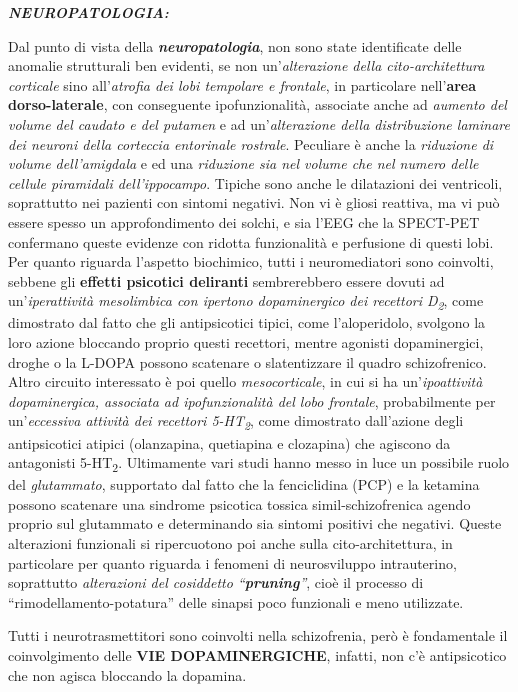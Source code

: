 \documentclass[]{article}
\begin{document}
\textbf{\emph{NEUROPATOLOGIA:}}

Dal punto di vista della \textbf{\emph{neuropatologia}}, non sono state
identificate delle anomalie strutturali ben evidenti, se non
un'\emph{alterazione della cito-architettura corticale} sino
all'\emph{atrofia dei lobi tempolare e frontale}, in particolare
nell'\textbf{area dorso-laterale}, con conseguente ipofunzionalità,
associate anche ad \emph{aumento del volume del caudato e del putamen} e
ad un'\emph{alterazione della distribuzione laminare dei neuroni della
corteccia entorinale rostrale}. Peculiare è anche la \emph{riduzione di
volume dell'amigdala} e ed una \emph{riduzione sia nel volume che nel
numero delle cellule piramidali dell'ippocampo}. Tipiche sono anche le
dilatazioni dei ventricoli, soprattutto nei pazienti con sintomi
negativi. Non vi è gliosi reattiva, ma vi può essere spesso un
approfondimento dei solchi, e sia l'EEG che la SPECT-PET confermano
queste evidenze con ridotta funzionalità e perfusione di questi lobi.
Per quanto riguarda l'aspetto biochimico, tutti i neuromediatori sono
coinvolti, sebbene gli \textbf{effetti psicotici deliranti}
sembrerebbero essere dovuti ad un'\emph{iperattività mesolimbica con
ipertono dopaminergico dei recettori D\textsubscript{2}}, come
dimostrato dal fatto che gli antipsicotici tipici, come l'aloperidolo,
svolgono la loro azione bloccando proprio questi recettori, mentre
agonisti dopaminergici, droghe o la L-DOPA possono scatenare o
slatentizzare il quadro schizofrenico. Altro circuito interessato è poi
quello \emph{mesocorticale}, in cui si ha un'\emph{ipoattività
dopaminergica, associata ad ipofunzionalità del lobo frontale},
probabilmente per un'\emph{eccessiva attività dei recettori
5-HT\textsubscript{2}}, come dimostrato dall'azione degli antipsicotici
atipici (olanzapina, quetiapina e clozapina) che agiscono da antagonisti
5-HT\textsubscript{2}. Ultimamente vari studi hanno messo in luce un
possibile ruolo del \emph{glutammato}, supportato dal fatto che la
fenciclidina (PCP) e la ketamina possono scatenare una sindrome
psicotica tossica simil-schizofrenica agendo proprio sul glutammato e
determinando sia sintomi positivi che negativi. Queste alterazioni
funzionali si ripercuotono poi anche sulla cito-architettura, in
particolare per quanto riguarda i fenomeni di neurosviluppo
intrauterino, soprattutto \emph{alterazioni del cosiddetto
``\textbf{pruning}''}, cioè il processo di ``rimodellamento-potatura''
delle sinapsi poco funzionali e meno utilizzate.

Tutti i neurotrasmettitori sono coinvolti nella schizofrenia, però è
fondamentale il coinvolgimento delle \textbf{VIE DOPAMINERGICHE},
infatti, non c'è antipsicotico che non agisca bloccando la dopamina.
\end{document}
